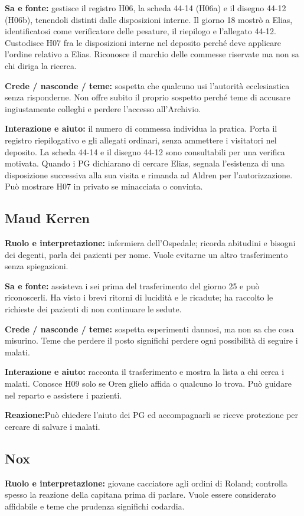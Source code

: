 \documentclass[11pt,a4paper]{article}
\begin{document}
\textbf{Sa e fonte:} gestisce il registro H06, la scheda 44-14 (H06a) e il disegno 44-12 (H06b), tenendoli distinti dalle disposizioni interne. Il giorno 18 mostrò a Elias, identificatosi come verificatore delle pesature, il riepilogo e l'allegato 44-12. Custodisce H07 fra le disposizioni interne nel deposito perché deve applicare l'ordine relativo a Elias. Riconosce il marchio delle commesse riservate ma non sa chi diriga la ricerca.

\textbf{Crede / nasconde / teme:} sospetta che qualcuno usi l'autorità ecclesiastica senza risponderne. Non offre subito il proprio sospetto perché teme di accusare ingiustamente colleghi e perdere l'accesso all'Archivio.

\textbf{Interazione e aiuto:} il numero di commessa individua la pratica. Porta il registro riepilogativo e gli allegati ordinari, senza ammettere i visitatori nel deposito. La scheda 44-14 e il disegno 44-12 sono consultabili per una verifica motivata. Quando i PG dichiarano di cercare Elias, segnala l'esistenza di una disposizione successiva alla sua visita e rimanda ad Aldren per l'autorizzazione. Può mostrare H07 in privato se minacciata o convinta.

\subsection{Maud Kerren}
\textbf{Ruolo e interpretazione:} infermiera dell'Ospedale; ricorda abitudini e bisogni dei degenti, parla dei pazienti per nome. Vuole evitarne un altro trasferimento senza spiegazioni.

\textbf{Sa e fonte:} assisteva i sei prima del trasferimento del giorno 25 e può riconoscerli. Ha visto i brevi ritorni di lucidità e le ricadute; ha raccolto le richieste dei pazienti di non continuare le sedute.

\textbf{Crede / nasconde / teme:} sospetta esperimenti dannosi, ma non sa che cosa misurino. Teme che perdere il posto significhi perdere ogni possibilità di seguire i malati.

\textbf{Interazione e aiuto:} racconta il trasferimento e mostra la lista a chi cerca i malati. Conosce H09 solo se Oren glielo affida o qualcuno lo trova. Può guidare nel reparto e assistere i pazienti.

\textbf{Reazione:}Può chiedere l'aiuto dei PG ed accompagnarli se riceve protezione per cercare di salvare i malati.

\subsection{Nox}
\textbf{Ruolo e interpretazione:} giovane cacciatore agli ordini di Roland; controlla spesso la reazione della capitana prima di parlare. Vuole essere considerato affidabile e teme che prudenza significhi codardia.
\end{document}
